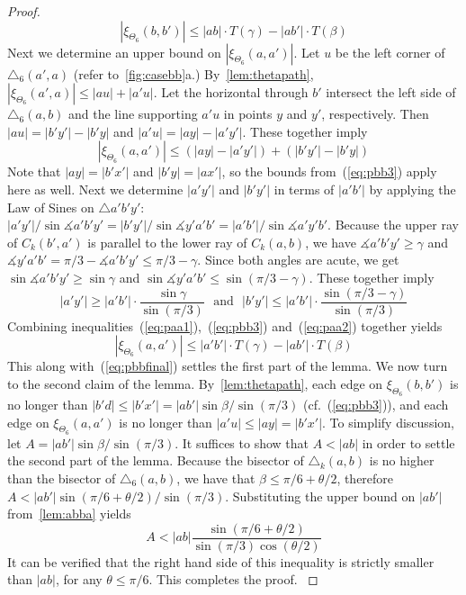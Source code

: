 \documentclass[runningheads,a4paper]{llncs}
\newcommand{\ABox}{
\raisebox{3pt}{\framebox[6pt]{\rule{6pt}{0pt}}}
}
\newcommand{\pp}{\xi}
\newcommand{\ang}{\measuredangle}
\begin{document}
\begin{proof}
\begin{equation}
|\pp_{\Theta_6}(b, b')| \le |ab|\cdot T(\gamma) - |ab'|\cdot T(\beta)
\label{eq:pbbfinal}
\end{equation}
Next we determine an upper bound on $|\pp_{\Theta_6}(a, a')|$.
Let $u$ be the left corner of $\triangle_6(a', a)$ (refer to~\autoref{fig:casebb}a.) By~\autoref{lem:thetapath}, $|\pp_{\Theta_6}(a', a)| \le |au| + |a'u|$.  
Let the horizontal through $b'$ intersect the left side of $\triangle_6(a, b)$ and the line supporting $a'u$ in points $y$ and $y'$, respectively. Then $|au| = |b'y'|-|b'y|$ and $|a'u| = |ay|-|a'y'|$. These together imply  
\begin{equation}
|\pp_{\Theta_6}(a, a')| \le (|ay|-|a'y'|)+(|b'y'|-|b'y|)
\label{eq:paa1}
\end{equation}
Note that $|ay| = |b'x'|$ and $|b'y| = |ax'|$, so the bounds from~(\ref{eq:pbb3}) apply here as well. 
Next we determine $|a'y'|$ and $|b'y'|$ in terms of $|a'b'|$ by applying the Law of Sines on $\triangle a'b'y'$: 
$|a'y'|/\sin\ang{a'b'y'}=|b'y'|/\sin\ang{y'a'b'}=|a'b'|/\sin\ang{a'y'b'}$. Because the upper ray of 
$C_k(b',a')$ is parallel to the lower ray of $C_k(a, b)$,  we have 
$\ang{a'b'y'} \ge \gamma$ and $\ang{y'a'b'} = \pi/3-\ang{a'b'y'} \le \pi/3- \gamma$. 
Since both angles are acute, we get  
$\sin\ang{a'b'y'} \ge \sin\gamma$ and $\sin\ang{y'a'b'} \le \sin(\pi/3-\gamma)$. These together imply 
\begin{equation}
|a'y'| \ge |a'b'|\cdot\frac{\sin\gamma}{\sin(\pi/3)} \mbox{~~and~~} |b'y'| \le |a'b'|\cdot\frac{\sin(\pi/3-\gamma)}{\sin(\pi/3)}
\label{eq:paa2}
\end{equation}
Combining inequalities~(\ref{eq:paa1}),~(\ref{eq:pbb3}) and~(\ref{eq:paa2}) together yields 
\begin{equation*}
|\pp_{\Theta_6}(a, a')| \le |a'b'|\cdot T(\gamma) - |ab'|\cdot T(\beta)
\label{eq:paafinal}
\end{equation*}
This along with~(\ref{eq:pbbfinal}) settles the first part of the lemma. 
We now turn to the second claim of the lemma. By~\autoref{lem:thetapath}, each edge on 
$\pp_{\Theta_6}(b,b')$ is no longer than $|b'd| \le |b'x'| = |ab'|\sin\beta/\sin(\pi/3)$ (cf.~(\ref{eq:pbb3})), and  
each edge on $\pp_{\Theta_6}(a,a')$ is no longer than $|a'u| \le |ay| = |b'x'|$. 
To simplify discussion, let $A = |ab'|\sin\beta/\sin(\pi/3)$. 
It suffices to show that $A < |ab|$ in order to settle the second part of the lemma. 
Because the bisector of $\triangle_k(a, b)$ is no higher than the bisector of $\triangle_6(a, b)$, we have that $\beta \le \pi/6+\theta/2$, therefore $A < |ab'|\sin(\pi/6+\theta/2)/\sin(\pi/3)$. Substituting the upper bound on $|ab'|$ from~\autoref{lem:abba} yields 
\[
A < |ab|\frac{\sin(\pi/6+\theta/2)}{\sin(\pi/3)\cos(\theta/2)}
\]
 It can be verified that the right hand side of this inequality is strictly smaller than $|ab|$, for any $\theta \le \pi/6$. This completes the proof.
{\hfill\ABox}\end{proof}
\end{document}
